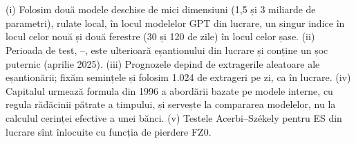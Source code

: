 \section{}
%
{(i) Folosim două modele deschise de mici dimensiuni (1,5 și 3 miliarde de parametri), rulate local, în locul modelelor GPT din lucrare, un singur indice în locul celor nouă și două ferestre (30 și 120 de zile) în locul celor șase. (ii) Perioada de test, \NtestStart--\NtestEnd, este ulterioară eșantionului din lucrare și conține un șoc puternic (aprilie 2025).
(iii) Prognozele depind de extragerile aleatoare ale eșantionării; fixăm semințele și folosim 1.024 de extrageri pe zi, ca în lucrare. (iv) Capitalul urmează formula din 1996 a abordării bazate pe modele interne, cu regula rădăcinii pătrate a timpului, și servește la compararea modelelor, nu la calculul cerinței efective a unei bănci. (v) Testele Acerbi--Székely pentru ES din lucrare sînt înlocuite cu funcția de pierdere FZ0.}

\newpage
